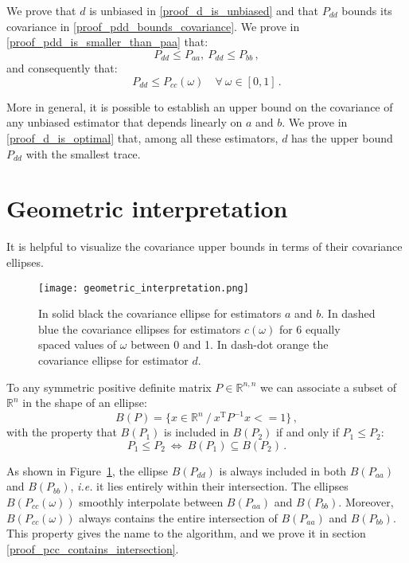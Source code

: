 \documentclass[11pt]{article}
\newcommand{\transpose}{\mathrm{\scriptscriptstyle T}}
\begin{document}
We prove that $d$ is unbiased in \ref{proof_d_is_unbiased} and that $P_{dd}$
bounds its covariance in \ref{proof_pdd_bounds_covariance}.  We prove in
\ref{proof_pdd_is_smaller_than_paa} that:
\begin{equation}
  P_{dd} \le P_{aa},\ P_{dd} \le P_{bb}\,,
\end{equation}
and consequently that:
\begin{equation}
    P_{dd}\le P_{cc}(\omega)\quad \forall\ \omega \in [0, 1]\,.
\end{equation}

More in general, it is possible to establish an upper bound on the covariance
of any unbiased estimator that depends linearly on $a$ and $b$. We prove in
\ref{proof_d_is_optimal} that, among all these estimators, $d$ has the upper
bound  $P_{dd}$ with the smallest trace.

\section{Geometric interpretation}

It is helpful to visualize the covariance upper bounds in terms of their
covariance ellipses.

\begin{figure}
\begin{center}
\texttt{[image: geometric\_interpretation.png]}
\caption{
\label{figure_geometric_interpretation}
In solid black the covariance ellipse for estimators $a$ and $b$. In dashed
blue the covariance ellipses for estimators $c(\omega)$ for 6 equally spaced
values of $\omega$ between 0 and 1. In dash-dot orange the covariance ellipse
for estimator $d$.
}
\end{center}
\end{figure}

To any symmetric positive definite matrix $P\in \mathbb{R}^{n,n}$ we can
associate a subset of $\mathbb{R}^n$ in the shape of an ellipse:
\begin{equation}
    B(P) = \{x\in\mathbb{R}^n\ /\ x^\transpose P^{-1} x <= 1\}\,,
\end{equation}
with the property that  $B(P_1)$ is included in $B(P_2)$ if and only if $P_1
\le P_2$:
\begin{equation}
    P_1 \le P_2\ \Leftrightarrow\ B(P_1) \subseteq B(P_2)\,.
\end{equation}

As shown in Figure~\ref{figure_geometric_interpretation}, the ellipse
$B(P_{dd})$ is always included in both $B(P_{aa})$ and $B(P_{bb})$, \emph{i.e.}
it lies entirely within their intersection. The ellipses $B(P_{cc}(\omega))$
smoothly interpolate between $B(P_{aa})$ and $B(P_{bb})$. Moreover,
$B(P_{cc}(\omega))$ always contains the entire intersection of $B(P_{aa})$ and
$B(P_{bb})$. This property gives the name to the algorithm, and we prove it in
section \ref{proof_pcc_contains_intersection}.
\end{document}
